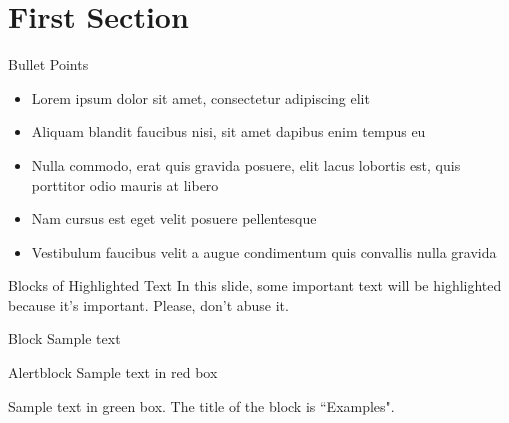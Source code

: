 \documentclass[aspectratio=169,xcolor=dvipsnames]{beamer}
\begin{document}
\section{First Section}
\begin{frame}{Bullet Points}
    \begin{itemize}
        \item Lorem ipsum dolor sit amet, consectetur adipiscing elit
        \item Aliquam blandit faucibus nisi, sit amet dapibus enim tempus eu
        \item Nulla commodo, erat quis gravida posuere, elit lacus lobortis est, quis porttitor odio mauris at libero
        \item Nam cursus est eget velit posuere pellentesque
        \item Vestibulum faucibus velit a augue condimentum quis convallis nulla gravida
    \end{itemize}
\end{frame}


\begin{frame}{Blocks of Highlighted Text}
    In this slide, some important text will be \alert{highlighted} because it's important. Please, don't abuse it.

    \begin{block}{Block}
        Sample text
    \end{block}

    \begin{alertblock}{Alertblock}
        Sample text in red box
    \end{alertblock}

    \begin{examples}
        Sample text in green box. The title of the block is ``Examples".
    \end{examples}
\end{frame}
\end{document}
